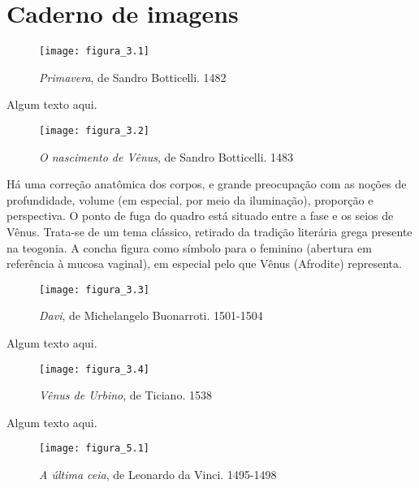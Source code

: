 \thispagestyle{empty}
\chapter*{Caderno de imagens}

\begin{figure}[h]
\texttt{[image: figura\_3.1]}
\caption{\textit{Primavera}, de Sandro Botticelli. 1482}
\label{fig:mesh3.1}
\end{figure}

Algum texto aqui.

\newpage

\begin{figure}[h]
\texttt{[image: figura\_3.2]}
\caption{\textit{O nascimento de Vênus}, de Sandro Botticelli. 1483}
\label{fig:mesh3.2}
\end{figure}

Há uma correção anatômica dos corpos, e grande preocupação com as noções de profundidade, volume (em especial, por meio da iluminação), proporção e perspectiva. O ponto de fuga do quadro está situado entre a fase e os seios de Vênus. Trata-se de um tema clássico, retirado da tradição literária grega presente na teogonia. A concha figura como símbolo para o feminino (abertura em referência à mucosa vaginal), em especial pelo que Vênus (Afrodite) representa.

\newpage

\begin{figure}[h]
\texttt{[image: figura\_3.3]}
\caption{\textit{Davi}, de Michelangelo Buonarroti. 1501-1504}
\label{fig:mesh3.3}
\end{figure}

Algum texto aqui.

\newpage

\begin{figure}[h]
\texttt{[image: figura\_3.4]}
\caption{\textit{Vênus de Urbino}, de Ticiano. 1538}
\label{fig:mesh3.4}
\end{figure}

Algum texto aqui.

\newpage

\begin{figure}[h]
\texttt{[image: figura\_5.1]}
\caption{\textit{A última ceia}, de Leonardo da Vinci. 1495-1498}
\label{fig:mesh5.1}
\end{figure}

